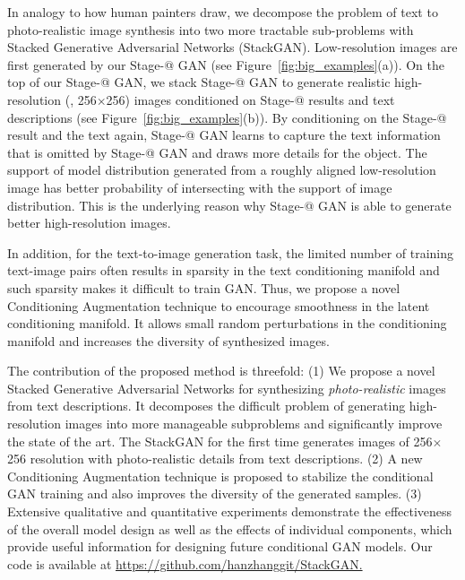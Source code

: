 \documentclass[10pt,twocolumn,letterpaper]{article}
\makeatletter
\newcommand{\Rmnum}[1]{\expandafter\@slowromancap\romannumeral #1@}
\makeatother
\begin{document}
 

In analogy to how human painters draw, we decompose the problem of text to photo-realistic image synthesis into two more tractable sub-problems with Stacked Generative Adversarial Networks (StackGAN). Low-resolution images are first generated by our Stage-\Rmnum{1} GAN (see Figure~\ref{fig:big_examples}(a)). On the top of our Stage-\Rmnum{1} GAN, we stack Stage-\Rmnum{2} GAN to generate realistic high-resolution (\eg, 256$\times$256) images conditioned on Stage-\Rmnum{1} results and text descriptions (see Figure~\ref{fig:big_examples}(b)). By conditioning on the Stage-\Rmnum{1} result and the text again, Stage-\Rmnum{2} GAN learns to capture the text information that is omitted by Stage-\Rmnum{1} GAN and draws more details for the object. The support of model distribution generated from a roughly aligned low-resolution image has better probability of intersecting with the support of image distribution. This is the underlying reason why Stage-\Rmnum{2} GAN is able to generate better high-resolution images.

In addition, for the text-to-image generation task, the limited number of training text-image pairs often results in sparsity in the text conditioning manifold and such sparsity makes it difficult to train GAN. Thus, we propose a novel Conditioning Augmentation technique to encourage smoothness in the latent conditioning manifold. It allows small random perturbations in the conditioning manifold and increases the diversity of synthesized images. 

The contribution of the proposed method is threefold: 
(1) We propose a novel Stacked Generative Adversarial Networks for synthesizing \emph{photo-realistic} images from text descriptions. It decomposes the difficult problem of generating high-resolution images into more manageable subproblems and significantly improve the state of the art. The StackGAN for the first time generates images of 256$\times$256 resolution with photo-realistic details from text descriptions. 
(2) A new Conditioning Augmentation technique is proposed to stabilize the conditional GAN training and also improves the diversity of the generated samples. 
(3) Extensive qualitative and quantitative experiments demonstrate the effectiveness of the overall model design as well as the effects of individual components, which provide useful information for designing future conditional GAN models. 
Our code is available at {\href{https://github.com/hanzhanggit/StackGAN}{https://github.com/hanzhanggit/StackGAN.}}
\end{document}
